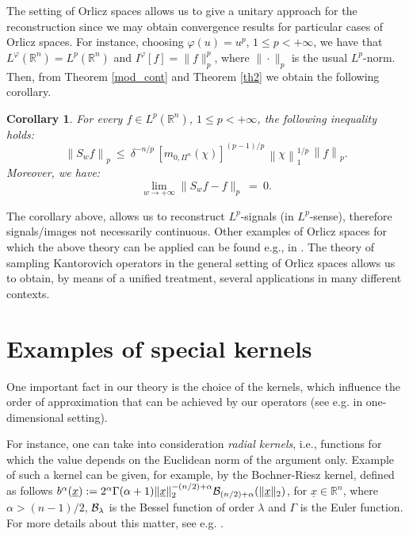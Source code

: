 \documentclass[11pt,a4paper]{article}
\newcommand{\miu}{\leq}
\newcommand{\R}{\mathbb{R}}
\newtheorem{corollary}[definition]{Corollary}
\begin{document}
The setting of Orlicz spaces allows us to give a unitary approach for the reconstruction since we may obtain convergence results for particular cases of Orlicz spaces. For instance, choosing $\varphi(u)=u^p$, $1 \leq p < +\infty$, we have that $L^{\varphi}(\R^n) = L^p(\R^n)$ and $I^{\varphi}[f]=\|f\|^p_{p}$, where $\| \cdot \|_p$ is the usual $L^p$-norm. Then, from Theorem \ref{mod_cont} and Theorem \ref{th2} we obtain the following corollary.
\begin{corollary}
For every $f \in L^p(\R^n)$, $1 \leq p < +\infty$, 
the following inequality holds:
\begin{displaymath}
\left\|S_w f\right\|_p\ \miu\ \delta^{-n/p}\, [m_{0,\Pi^n}(\chi)]^{(p-1)/p}\, \left\|\chi\right\|^{1/p}_1\, \left\|f\right\|_p.
\end{displaymath}
Moreover, we have:
$$
\lim_{w \to +\infty} \|S_w f-f\|_p\ =\ 0.
$$
\end{corollary}
The corollary above, allows us to reconstruct $L^p$-signals (in $L^p$-sense), therefore signals/images not necessarily continuous. Other examples of Orlicz spaces for which the above theory can be applied can be found e.g., in \cite{MUORL,MU1,BAMUVI,BABUSTVI,COVI}. The theory of sampling Kantorovich operators in the general setting of Orlicz spaces allows us to obtain, by means of a unified treatment, several applications in many different contexts.


\section{Examples of special kernels} \label{sec5}

One important fact in our theory is the choice of the kernels, which influence the order of approximation that can be achieved by our operators (see e.g. \cite{COVI3} in one-dimensional setting).

  For instance, one  can take into consideration  {\em radial kernels}, i.e., functions for which the value depends on the Euclidean norm of the argument only. Example of such a kernel can be given, for example, by the Bochner-Riesz kernel, defined as follows $b^{\alpha}(\underline{x}):=2^{\alpha}\Gamma(\alpha+1)\|\underline{x}\|_2^{-(n/2)+\alpha}{\cal B}_{(n/2)+\alpha}(\|\underline{x}\|_2)$,
for $\underline{x} \in \R^n$, where $\alpha > (n-1)/2$, ${\cal B}_{\lambda}$ is the Bessel function of order $\lambda$ and $\Gamma$ is the Euler function. For more  details about this matter,  see e.g. \cite{BUFIST}. 
\end{document}
